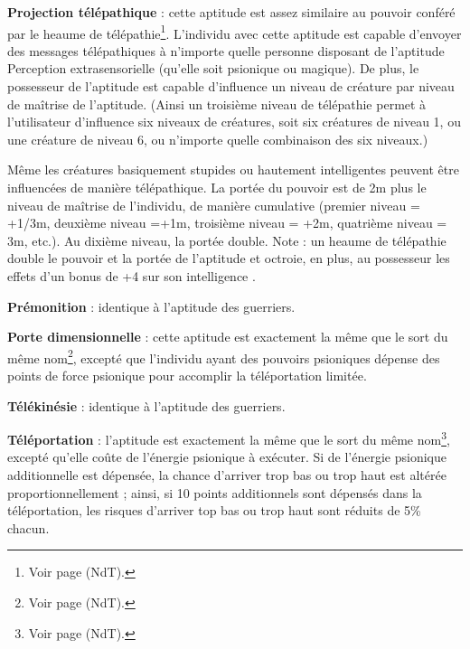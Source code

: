 {\bigskip

\textbf{Projection télépathique} : cette aptitude est assez similaire au pouvoir conféré par le heaume de télépathie\footnote{Voir page \pageref{objet-heaume-telepathie} (NdT).}. L'individu avec cette aptitude est capable d'envoyer des messages télépathiques à n'importe quelle personne  disposant de l'aptitude Perception extrasensorielle (qu'elle soit psionique ou magique). De plus, le possesseur de l'aptitude est capable d'influence un niveau de créature par niveau de maîtrise de l'aptitude. (Ainsi un troisième niveau de télépathie permet à l'utilisateur d'influence six niveaux de créatures, soit six créatures de niveau 1, ou une créature de niveau 6, ou n'importe quelle combinaison des six niveaux.)

\bigskip

Même les créatures basiquement stupides ou hautement intelligentes peuvent être influencées de manière télépathique. La portée du pouvoir est de 2m plus le niveau de maîtrise de l'individu, de manière cumulative (premier niveau = +1/3m, deuxième niveau =+1m, troisième niveau = +2m, quatrième niveau = 3m, etc.). Au dixième niveau, la portée double. Note : un heaume de télépathie double le pouvoir et la portée de l'aptitude et octroie, en plus, au possesseur les effets d'un bonus de +4 sur son intelligence .

\bigskip

\textbf{Prémonition} : identique à l'aptitude des guerriers.

\bigskip

\textbf{Porte dimensionnelle} : cette aptitude est exactement la même que le sort du même nom\footnote{Voir page \pageref{sort-porte-dimensionnelle} (NdT).}, excepté que l'individu ayant des pouvoirs psioniques dépense des points de force psionique pour accomplir la téléportation limitée.

\bigskip

\textbf{Télékinésie} : identique à l'aptitude des guerriers.

\bigskip

\textbf{Téléportation} : l'aptitude est exactement la même que le sort du même nom\footnote{Voir page \pageref{sort-teleporter} (NdT).}, excepté qu'elle coûte de l'énergie psionique à exécuter. Si de l'énergie psionique additionnelle est dépensée, la chance d'arriver trop bas ou trop haut est altérée proportionnellement ; ainsi, si 10 points additionnels sont dépensés dans la téléportation, les risques d'arriver top bas ou trop haut sont réduits de 5\% chacun.

}
